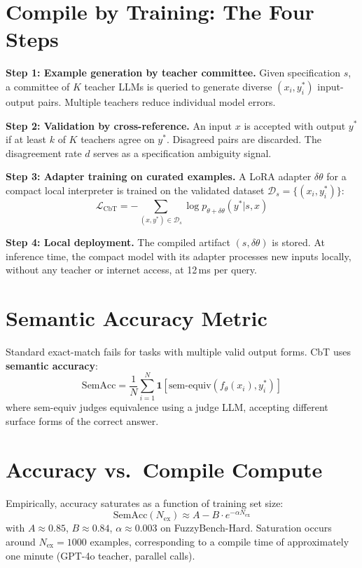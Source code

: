 \documentclass[10pt,twocolumn]{article}
\begin{document}
\section{Compile by Training: The Four Steps}

\textbf{Step 1: Example generation by teacher committee.}
Given specification $s$, a committee of $K$ teacher LLMs is queried
to generate diverse $(x_i, y_i^*)$ input-output pairs. Multiple teachers
reduce individual model errors.

\textbf{Step 2: Validation by cross-reference.}
An input $x$ is accepted with output $y^*$ if at least $k$ of $K$
teachers agree on $y^*$. Disagreed pairs are discarded. The disagreement
rate $d$ serves as a specification ambiguity signal.

\textbf{Step 3: Adapter training on curated examples.}
A LoRA adapter $\delta\theta$ for a compact local interpreter is trained
on the validated dataset $\mathcal{D}_s = \{(x_i, y_i^*)\}$:
\[
  \mathcal{L}_{\text{CbT}} =
  -\sum_{(x,y^*) \in \mathcal{D}_s} \log p_{\theta + \delta\theta}(y^* | s, x)
\]

\textbf{Step 4: Local deployment.}
The compiled artifact $(s, \delta\theta)$ is stored. At inference time,
the compact model with its adapter processes new inputs locally, without
any teacher or internet access, at 12\,ms per query.

\section{Semantic Accuracy Metric}

Standard exact-match fails for tasks with multiple valid output forms.
CbT uses \textbf{semantic accuracy}:
\[
  \text{SemAcc} = \frac{1}{N}
  \sum_{i=1}^N \mathbf{1}[\text{sem-equiv}(f_\theta(x_i), y_i^*)]
\]
where sem-equiv judges equivalence using a judge LLM, accepting
different surface forms of the correct answer.

\section{Accuracy vs.\ Compile Compute}

Empirically, accuracy saturates as a function of training set size:
\[
  \text{SemAcc}(N_{\text{ex}}) \approx A - B \cdot e^{-\alpha N_{\text{ex}}}
\]
with $A \approx 0.85$, $B \approx 0.84$, $\alpha \approx 0.003$ on
FuzzyBench-Hard. Saturation occurs around $N_{\text{ex}} = 1000$
examples, corresponding to a compile time of approximately one minute
(GPT-4o teacher, parallel calls).
\end{document}
